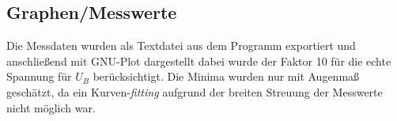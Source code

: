\subsection{Graphen/Messwerte}
Die Messdaten wurden als Textdatei aus dem Programm exportiert und anschließend mit GNU-Plot dargestellt dabei wurde der Faktor 10 für die echte Spannung für \(U_B\) berücksichtigt. Die Minima wurden nur mit Augenmaß geschätzt, da ein Kurven-\textit{fitting} aufgrund der  breiten Streuung der Messwerte nicht möglich war. 
\begin{center}
\begin{minipage}{\linewidth}
\centering
{}
\label{a1}
\end{minipage}
\begin{minipage}{\linewidth}
\centering
{}

\end{minipage}
\end{center}
